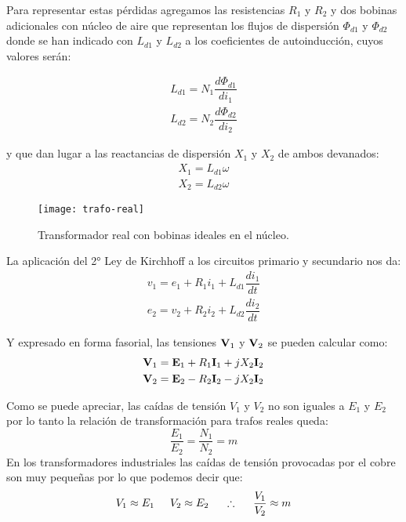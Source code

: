 Para representar estas pérdidas agregamos las resistencias $R_{1}$ y $R_{2}$ y dos bobinas adicionales con núcleo de aire que representan los flujos de dispersión $\Phi_{d1}$ y $\Phi_{d2}$ donde se han indicado con $L_{d1}$ y $L_{d2}$ a los coeficientes de autoinducción, cuyos valores serán:

\begin{equation*}
	\begin{split}
		L_{d1} = N_1 \dfrac{d\Phi_{d1}}{di_1} \\
		L_{d2} = N_2 \dfrac{d\Phi_{d2}}{di_2}
	\end{split}
\end{equation*}

y que dan lugar a las reactancias de dispersión $X_{1}$ y $X_{2}$ de ambos devanados:
\begin{equation*}
	\begin{split}
		X_1 = L_{d1} \omega \\
		X_2 = L_{d2} \omega
	\end{split}
\end{equation*}

 \begin{figure}[H]
	\centering
	\texttt{[image: trafo-real]}
	\caption{Transformador real con bobinas ideales en el núcleo.}
	\label{fig:tranformador-real}
\end{figure} 

La aplicación del 2° Ley de Kirchhoff a los circuitos primario y secundario nos da:
\begin{equation*}
	\begin{split}
		v_1 = e_1 + R_1 i_1 + L_{d1} \dfrac{di_1}{dt}\\
		e_2 = v_2 + R_2 i_2 + L_{d2} \dfrac{di_2}{dt}
	\end{split}
\end{equation*}

Y expresado en forma fasorial, las tensiones $\fasor{V}_1$ y $\fasor{V}_2$ se pueden calcular como:
\begin{equation*}
	\begin{split}
		\fasor{v}_{1} = \fasor{e}_{1} + R_{1}  \fasor{i}_{1} + j X_{2} \fasor{i}_{2} \\
		\fasor{v}_{2} = \fasor{e}_{2} - R_{2} \fasor{i}_{2} - j X_{2} \fasor{i}_{2}
	\end{split}
\end{equation*}
 
Como se puede apreciar, las caídas de tensión $V_{1}$ y $V_{2}$ no son iguales a $E_{1}$ y $E_{2}$ por lo tanto la relación de transformación para trafos reales queda:
\begin{equation}
	\dfrac{E_{1}}{E_{2}}=\dfrac{N_{1}}{N_{2}}=m
	\label{eq:rel-transf-real}
\end{equation}
En los transformadores industriales las caídas de tensión provocadas por el cobre son muy pequeñas por lo que podemos decir que:
\begin{equation}
	V_{1} \approx E_{1} \hspace{5mm}  V_{2} \approx E_{2}  \hspace{5mm} \therefore \hspace{5mm} \dfrac{V_{1}}{V_{2}} \approx m
\end{equation}

